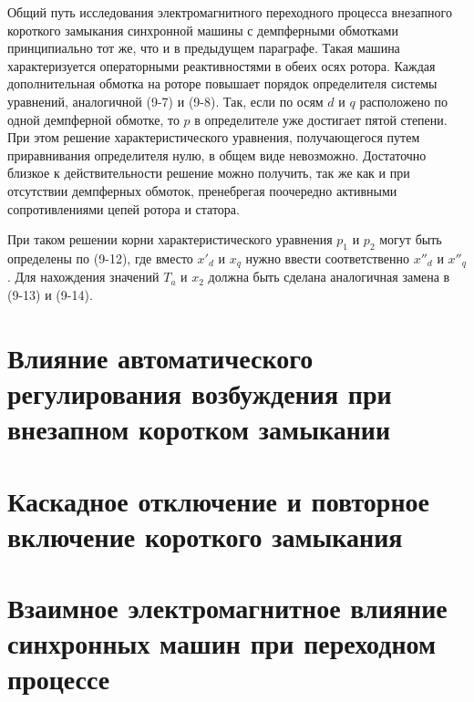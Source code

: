 Общий путь исследования электромагнитного переходного процесса внезапного короткого замыкания синхронной машины с демпферными обмотками принципиально тот же, что и в предыдущем параграфе. Такая машина характеризуется операторными реактивностями в обеих осях ротора. Каждая дополнительная обмотка на роторе повышает порядок определителя системы уравнений, аналогичной (9-7) и (9-8). Так, если по осям $ d $ и $ q $ расположено по одной демпферной обмотке, то $ p $ в определителе уже достигает пятой степени. При этом решение характеристического уравнения, получающегося путем приравнивания определителя нулю, в общем виде невозможно. Достаточно близкое к действительности решение можно получить, так же как и при отсутствии демпферных обмоток, пренебрегая поочередно активными сопротивлениями цепей ротора и статора.

При таком решении корни характеристического уравнения $ p_1 $ и $ p_2 $ могут быть определены по (9-12), где вместо $ x'_d $ и $ x_q $ нужно ввести соответственно $ x''_d $ и $ x''_q $. Для нахождения значений $ T_a $ и $ x_2 $ должна быть сделана аналогичная замена в (9-13) и (9-14).


\section{Влияние автоматического регулирования возбуждения при внезапном коротком замыкании}
\label{sec:9-4}


\section{Каскадное отключение и повторное включение короткого замыкания}
\label{sec:9-5}


\section{Взаимное электромагнитное влияние синхронных машин при переходном процессе}
\label{sec:9-6}